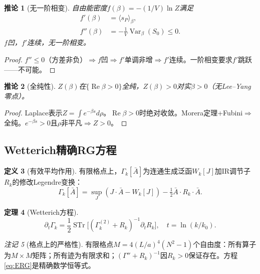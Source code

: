 \documentclass[12pt,a4paper]{article}
\theoremstyle{plain}
\newtheorem{theorem}{定理}[section]
\newtheorem{corollary}[theorem]{推论}
\theoremstyle{definition}
\newtheorem{definition}[theorem]{定义}
\theoremstyle{remark}
\newtheorem{remark}[theorem]{注记}
\begin{document}
\begin{corollary}[无一阶相变]\label{cor:no1st}
自由能密度$f(\beta)=-(1/V)\ln Z$满足
\begin{align}
f'(\beta) &= \langle s_P\rangle_\beta, \label{eq:fprime}\\
f''(\beta) &= -\frac{1}{V}\operatorname{Var}_\beta(S_0) \leq 0. \label{eq:fdprime}
\end{align}
$f$凹，$f'$连续，无一阶相变。
\end{corollary}

\begin{proof}
$f''\leq 0$（方差非负）$\Rightarrow f$凹$\Rightarrow f'$单调非增$\Rightarrow f'$连续。一阶相变要求$f'$跳跃——不可能。
\end{proof}

\begin{corollary}[全纯性]\label{cor:holo}
$Z(\beta)$在$\{\operatorname{Re}\beta>0\}$全纯，$Z(\beta)>0$对实$\beta>0$（无Lee--Yang零点）。
\end{corollary}

\begin{proof}
Laplace表示$Z=\int e^{-\beta s}d\rho$。$\operatorname{Re}\beta>0$时绝对收敛。Morera定理+Fubini$\Rightarrow$全纯。$e^{-\beta s}>0$且$\rho$非平凡$\Rightarrow Z>0$。
\end{proof}

\subsection{Wetterich精确RG方程}\label{sec:ERG}

\begin{definition}[有效平均作用]\label{def:Gamma}
有限格点上，$\Gamma_k[\bar{A}]$为连通生成泛函$W_k[J]$加IR调节子$R_k$的修改Legendre变换：
\begin{equation}\label{eq:Gammadef}
\Gamma_k[\bar{A}] = \sup_J(J\cdot\bar{A} - W_k[J]) - \tfrac{1}{2}\bar{A}\cdot R_k\cdot\bar{A}.
\end{equation}
\end{definition}

\begin{theorem}[Wetterich方程\cite{Wetterich1993}]\label{thm:ERG}
\begin{equation}\label{eq:ERG}
\partial_t\Gamma_k = \frac{1}{2}\operatorname{STr}\!\Big[(\Gamma_k^{(2)}+R_k)^{-1}\partial_tR_k\Big], \quad t=\ln(k/k_0).
\end{equation}
\end{theorem}

\begin{remark}[格点上的严格性]\label{rem:rigorous}
有限格点$M=4(L/a)^4(N^2-1)$个自由度：所有算子为$M\times M$矩阵；所有迹为有限求和；$(\Gamma''+R_k)^{-1}$因$R_k>0$保证存在。方程\eqref{eq:ERG}是精确数学恒等式。
\end{remark}
\end{document}
